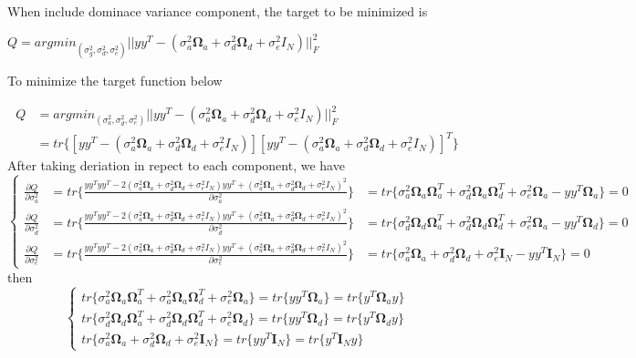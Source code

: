 \documentclass[]{article}
\begin{document}
When include dominace variance component, the target to be minimized is

\(Q=argmin_{(\sigma^2_g,\sigma^2_d,\sigma^2_e)}|| yy^T-(\sigma^2_a\mathbf{\Omega}_a+\sigma^2_d\mathbf{\Omega}_d+\sigma^2_eI_N)||_F^2\)

To minimize the target function below

\[
\begin{align}
Q&=argmin_{(\sigma^2_a,\sigma^2_d,\sigma^2_e)}|| yy^T-(\sigma^2_a\mathbf{\Omega}_a+\sigma^2_d\mathbf{\Omega}_d+\sigma^2_eI_N)||_F^2\\
&=tr\{[yy^T-(\sigma^2_a\mathbf{\Omega}_a+\sigma^2_d\mathbf{\Omega}_d+\sigma^2_eI_N)][yy^T-(\sigma^2_a\mathbf{\Omega}_a+\sigma^2_d\mathbf{\Omega}_d+\sigma^2_eI_N)]^T\}
\end{align}
\] After taking deriation in repect to each component, we have \[
\left\{
 \begin{array}{lll}
  \frac{\partial{Q}}{\partial{\sigma^2_a}} & =tr\{\frac{yy^Tyy^T-2(\sigma^2_a\mathbf{\Omega}_a+\sigma^2_d\mathbf{\Omega}_d+\sigma^2_eI_N)yy^T+(\sigma^2_a\mathbf{\Omega}_a+\sigma^2_d\mathbf{\Omega}_d+\sigma^2_eI_N)^2}{\partial{\sigma^2_a}}\}&=tr\{\sigma^2_a\mathbf{\Omega}_a\mathbf{\Omega}_a^T+\sigma^2_d\mathbf{\Omega}_a\mathbf{\Omega}_d^T+\sigma^2_e\mathbf{\Omega}_a-yy^T\mathbf{\Omega}_a\}=0\\
  \frac{\partial{Q}}{\partial{\sigma^2_d}} & =tr\{\frac{yy^Tyy^T-2(\sigma^2_a\mathbf{\Omega}_a+\sigma^2_d\mathbf{\Omega}_d+\sigma^2_eI_N)yy^T+(\sigma^2_a\mathbf{\Omega}_a+\sigma^2_d\mathbf{\Omega}_d+\sigma^2_eI_N)^2}{\partial{\sigma^2_d}}\}&=tr\{\sigma^2_d\mathbf{\Omega}_d\mathbf{\Omega}_a^T+\sigma^2_d\mathbf{\Omega}_d\mathbf{\Omega}_d^T+\sigma^2_e\mathbf{\Omega}_a-yy^T\mathbf{\Omega}_d\}=0\\
  \frac{\partial{Q}}{\partial{\sigma^2_e}} & =tr\{\frac{yy^Tyy^T-2(\sigma^2_a\mathbf{\Omega}_a+\sigma^2_d\mathbf{\Omega}_d+\sigma^2_eI_N)yy^T+(\sigma^2_a\mathbf{\Omega}_a+\sigma^2_d\mathbf{\Omega}_d+\sigma^2_eI_N)^2}{\partial{\sigma^2_e}}\}&=tr\{\sigma^2_a\mathbf{\Omega}_a+\sigma^2_d\mathbf{\Omega}_d+\sigma^2_e\mathbf{I}_N-yy^T\mathbf{I}_N\}=0
 \end{array}
\right.
\] then \[
\left\{
 \begin{array}{lll}
tr\{\sigma^2_a\mathbf{\Omega}_a\mathbf{\Omega}_a^T+\sigma^2_a\mathbf{\Omega}_a\mathbf{\Omega}_d^T+\sigma^2_e\mathbf{\Omega}_a\}=tr\{yy^T\mathbf{\Omega}_a\}=tr\{y^T\mathbf{\Omega}_ay\}\\
tr\{\sigma^2_d\mathbf{\Omega}_d\mathbf{\Omega}_a^T+\sigma^2_d\mathbf{\Omega}_d\mathbf{\Omega}_d^T+\sigma^2_e\mathbf{\Omega}_d\}=tr\{yy^T\mathbf{\Omega}_d\}=tr\{y^T\mathbf{\Omega}_dy\}\\
tr\{\sigma^2_a\mathbf{\Omega}_a+\sigma^2_d\mathbf{\Omega}_d+\sigma^2_e\mathbf{I}_N\}=tr\{yy^T\mathbf{I}_N\}=tr\{y^T\mathbf{I}_Ny\}
 \end{array}
\right.
\]
\end{document}
